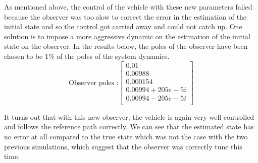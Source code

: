 As mentioned above, the control of the vehicle with these new parameters failed because the observer was too slow to correct the error in the estimation of the initial state and so the control got carried away and could not catch up. One solution is to impose a more aggressive dynamic on the estimation of the initial state on the observer. In the results below, the poles of the observer have been chosen to be 1\% of the poles of the system dynamics.
\begin{equation}
    \text{Observer poles :}
    \left[\begin{array}{c}
         0.01\\
         0.00988\\
         0.000154\\
         0.00994 + 205e-5i\\
         0.00994 - 205e-5i\\
    \end{array}\right]
\end{equation}

It turns out that with this new observer, the vehicle is again very well controlled and follows the reference path correctly. We can see that the estimated state has no error at all compared to the true state which was not the case with the two previous simulations, which suggest that the observer was correctly tune this time.

